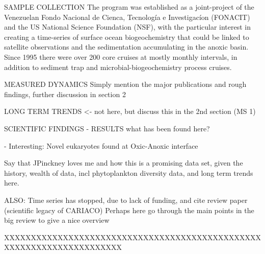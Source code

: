 SAMPLE COLLECTION
The program was established as a joint-project of the Venezuelan Fondo Nacional de Cienca, Tecnolog\'{i}a e Investigac\'{i}on (FONACIT) and the US National Science Foundation (NSF), with the particular interest in creating a time-series of surface ocean biogeochemistry that could be linked to satellite observations and the sedimentation accumulating in the anoxic basin. Since 1995 there were over 200 core cruises at mostly monthly intervals, in addition to sediment trap and microbial-biogeochemistry process cruises. 


MEASURED DYNAMICS
Simply mention the major publications and rough findings, further discussion in section 2

LONG TERM TRENDS <- not here, but discuss this in the 2nd section (MS 1)

SCIENTIFIC FINDINGS - RESULTS what has been found here?

- Interesting: Novel eukaryotes found at Oxic-Anoxic interface \citep{Stoeck2003}

Say that JPinckney loves me
and how this is a promising data set, given the history, wealth of data, incl phytoplankton diversity data, and long term trends here.

ALSO: Time series has stopped, due to lack of funding, and cite review paper (scientific legacy of CARIACO) \citep{Muller-Karger2019a}
Perhaps here go through the main points in the big review to give a nice overview



XXXXXXXXXXXXXXXXXXXXXXXXXXXXXXXXXXXXXXXXXXXXXXXXXXXXXXXXXXXXXXXXXXXXXX


